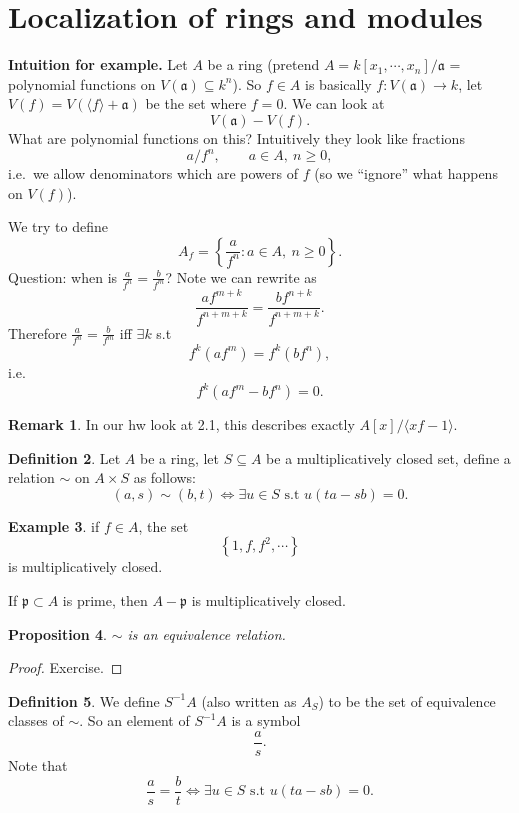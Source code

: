 \documentclass[11pt,a4paper]{article}
\theoremstyle{definition}
\newtheorem{definition}{Definition}[section]
\newtheorem{example}[definition]{Example}
\newtheorem{remark}[definition]{Remark}
\theoremstyle{plain}
\newtheorem{proposition}[definition]{Proposition}
\theoremstyle{remark}
\renewcommand{\set}[1]{\left\{ #1 \right\}}
\newcommand{\angles}[1]{\langle #1 \rangle}
\begin{document}
\section{Localization of rings and modules} 

\textbf{Intuition for example.}
Let $A$ be a ring (pretend $A = k[x_1, \cdots, x_n] / \mathfrak{a}$ = polynomial functions on $V(\mathfrak{a}) \subseteq k^n$).
So $f \in A$ is basically $f \colon V(\mathfrak{a}) \to k$, let $V(f) = V(\angles{f} + \mathfrak{a})$ be the set where $f = 0$.
We can look at 
$$V(\mathfrak{a}) - V(f).$$
What are polynomial functions on this? Intuitively they look like fractions
$$a / f^n,\qquad a\in A,\ n\ge 0,$$
i.e.\ we allow denominators which are powers of $f$ (so we ``ignore'' what happens on $V(f)$).

We try to define 
$$A_f = \set{\frac{a}{f^n} \colon a \in A, \ n \ge 0}.$$
Question: when is $\frac{a}{f^n} = \frac{b}{f^m}$?
Note we can rewrite as
$$\frac{a f^{m+k}}{f^{n+m+k}} = \frac{b f^{n + k}}{f^{n+m+k}}.$$
Therefore $\frac{a}{f^n} = \frac{b}{f^m}$ iff $\exists k$ s.t 
$$f^k(af^m) = f^k(bf^n),$$
i.e.
$$f^k(af^m - bf^n) = 0.$$

\begin{remark}
    In our hw look at 2.1, this describes exactly $A[x] / \angles{xf-1}$.
\end{remark}

\begin{definition}
    Let $A$ be a ring, let $S \subseteq A$ be a multiplicatively closed set, define a relation $\sim$ on $A \times S$ as follows: 
    $$(a, s) \sim (b,t) \iff \exists u \in S \text{ s.t } u(ta - sb)=0.$$
\end{definition}

\begin{example}
    if $f \in A$, the set 
    $$\set{1, f, f^2, \cdots}$$
    is multiplicatively closed. 

    If $\mathfrak{p} \subset A$ is prime, then $A - \mathfrak{p}$ is multiplicatively closed. 
\end{example}

\begin{proposition}
    $\sim$ is an equivalence relation. 
\end{proposition}

\begin{proof}
    Exercise.
\end{proof}

\begin{definition}
    We define $S^{-1}A$ (also written as $A_S$) to be the set of equivalence classes of $\sim$. So an element of $S^{-1} A$ is a symbol 
    $$\frac{a}{s}.$$
    Note that 
    $$\frac{a}{s} = \frac{b}{t} \iff \exists u \in S \text{ s.t } u(ta - sb)=0.$$
\end{definition}
\end{document}
